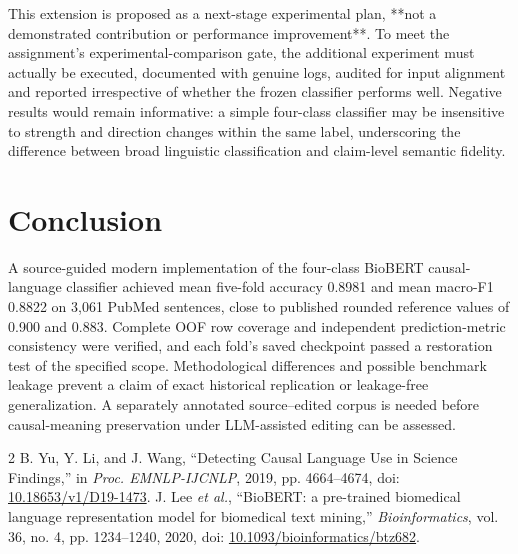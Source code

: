 \documentclass[conference]{IEEEtran}
\begin{document}
This extension is proposed as a next-stage experimental plan, **not a demonstrated contribution or performance improvement**. To meet the assignment's experimental-comparison gate, the additional experiment must actually be executed, documented with genuine logs, audited for input alignment and reported irrespective of whether the frozen classifier performs well. Negative results would remain informative: a simple four-class classifier may be insensitive to strength and direction changes within the same label, underscoring the difference between broad linguistic classification and claim-level semantic fidelity.

\section{Conclusion}\label{sec:conclusion}
A source-guided modern implementation of the four-class BioBERT causal-language classifier achieved mean five-fold accuracy 0.8981 and mean macro-F1 0.8822 on 3,061 PubMed sentences, close to published rounded reference values of 0.900 and 0.883. Complete OOF row coverage and independent prediction-metric consistency were verified, and each fold's saved checkpoint passed a restoration test of the specified scope. Methodological differences and possible benchmark leakage prevent a claim of exact historical replication or leakage-free generalization. A separately annotated source--edited corpus is needed before causal-meaning preservation under LLM-assisted editing can be assessed.

\begin{thebibliography}{2}
 B. Yu, Y. Li, and J. Wang, ``Detecting Causal Language Use in Science Findings,'' in \emph{Proc. EMNLP-IJCNLP}, 2019, pp. 4664--4674, doi: \href{https://doi.org/10.18653/v1/D19-1473}{10.18653/v1/D19-1473}.
 J. Lee \emph{et al.}, ``BioBERT: a pre-trained biomedical language representation model for biomedical text mining,'' \emph{Bioinformatics}, vol. 36, no. 4, pp. 1234--1240, 2020, doi: \href{https://doi.org/10.1093/bioinformatics/btz682}{10.1093/bioinformatics/btz682}.
\end{thebibliography}
\end{document}

